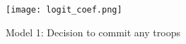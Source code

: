		\begin{figure}[H]
			\centering
				\texttt{[image: logit\_coef.png]}
			\caption{Model 1: Decision to commit any troops}
			\label{fig:logit_reg}
			\end{figure}